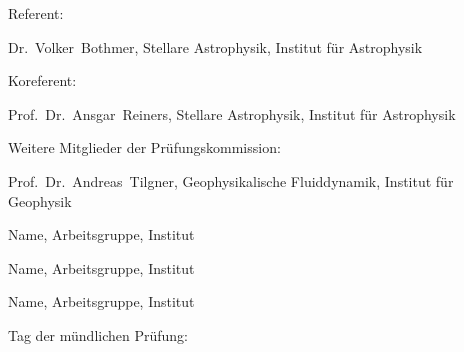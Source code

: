 \noindent Referent:

Dr.~Volker~Bothmer, Stellare Astrophysik, Institut für Astrophysik
\vspace{\baselineskip}

\noindent Koreferent:

Prof.~Dr.~Ansgar~Reiners, Stellare Astrophysik, Institut für Astrophysik
% 
% 
\vspace{\baselineskip}

\noindent Weitere Mitglieder der Prüfungskommission:
\vspace{\baselineskip}

Prof.~Dr.~Andreas~Tilgner, Geophysikalische Fluiddynamik, Institut für Geophysik
\vspace{\baselineskip}

Name, Arbeitsgruppe, Institut
\vspace{\baselineskip}

Name, Arbeitsgruppe, Institut
\vspace{\baselineskip}

Name, Arbeitsgruppe, Institut
\vspace{3\baselineskip}

\noindent Tag der mündlichen Prüfung: \underline{\hspace{3cm}}


\cleardoublepage


% 
% 
% 


